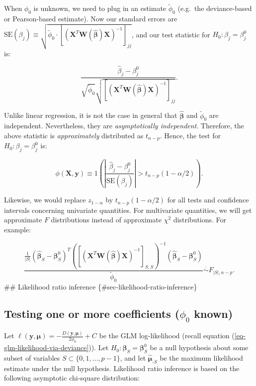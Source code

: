 \documentclass[
  11pt,
  letterpaper,
  oneside]{book}
\theoremstyle{plain}
\theoremstyle{plain}
\theoremstyle{definition}
\theoremstyle{definition}
\theoremstyle{plain}
\theoremstyle{remark}
\begin{document}
When \(\phi_0\) is unknown, we need to plug in an estimate
\(\widetilde \phi_0\) (e.g.~the deviance-based or Pearson-based
estimate). Now our standard errors are
\(\text{SE}(\beta_j) \equiv \sqrt{\widetilde \phi_0 \cdot [(\boldsymbol{X}^T \boldsymbol{W}(\boldsymbol{\widehat \beta}) \boldsymbol{X})^{-1}]_{jj}}\),
and our test statistic for \(H_0: \beta_j = \beta_j^0\) is:

\[
\frac{\widehat \beta_j - \beta_j^0}{\sqrt{\widetilde \phi_0}\sqrt{[(\boldsymbol{X}^T \boldsymbol{W}(\boldsymbol{\widehat \beta}) \boldsymbol{X})^{-1}]_{jj}}}.
\]

Unlike linear regression, it is not the case in general that
\(\boldsymbol{\widehat \beta}\) and \(\widetilde \phi_0\) are
independent. Nevertheless, they are \emph{asymptotically independent}.
Therefore, the above statistic is \emph{approximately} distributed as
\(t_{n-p}\). Hence, the test for \(H_0: \beta_j = \beta_j^0\) is:

\[
\phi(\boldsymbol{X}, \boldsymbol{y}) \equiv 1\left(\left|\frac{\widehat \beta_j - \beta_j^0}{\text{SE}(\beta_j)}\right| > t_{n-p}(1-\alpha/2)\right).
\]

Likewise, we would replace \(z_{1-\alpha}\) by \(t_{n-p}(1-\alpha/2)\)
for all tests and confidence intervals concerning univariate quantities.
For multivariate quantities, we will get approximate \(F\) distributions
instead of approximate \(\chi^2\) distributions. For example:

\[
\frac{\frac{1}{|S|}(\boldsymbol{\widehat \beta}_S - \boldsymbol{\beta}_S^0)^T \left([(\boldsymbol{X}^T \boldsymbol{W}(\boldsymbol{\widehat \beta}) \boldsymbol{X})^{-1}]_{S,S}\right)^{-1}(\boldsymbol{\widehat \beta}_S - \boldsymbol{\beta}_S^0)}{\widetilde \phi_0} \overset{\cdot}{\sim} F_{|S|, n-p}.
\] \#\# Likelihood ratio inference \{\#sec-likelihood-ratio-inference\}

\hypertarget{sec-likelihood-ratio-coeff-known}{%
\subsection{\texorpdfstring{Testing one or more coefficients (\(\phi_0\)
known)}{Testing one or more coefficients (\textbackslash phi\_0 known)}}\label{sec-likelihood-ratio-coeff-known}}

Let
\(\ell(\boldsymbol{y}, \boldsymbol{\mu}) = -\frac{D(\boldsymbol{y}, \boldsymbol{\mu})}{2\phi_0} + C\)
be the GLM log-likelihood (recall equation
(\ref{eq-glm-likelihood-via-deviance})). Let
\(H_0: \boldsymbol{\beta}_S = \boldsymbol{\beta}_S^0\) be a null
hypothesis about some subset of variables
\(S \subset \{0, 1, \dots, p-1\}\), and let
\(\boldsymbol{\widehat{\mu}}_{\text{-}S}\) be the maximum likelihood
estimate under the null hypothesis. Likelihood ratio inference is based
on the following asymptotic chi-square distribution:
\end{document}
